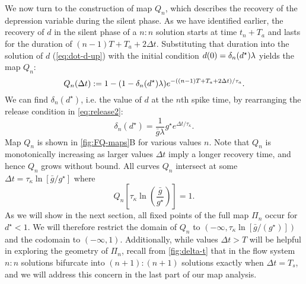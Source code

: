 We now turn to the construction of map $Q_n$, which describes the recovery of the depression variable during the silent phase.
As we have identified earlier, the recovery of $d$ in the silent phase of a $n:n$ solution starts at time $t_{n} + T_{a}$ and lasts for the duration of $(n-1)T + T_{a} + 2\Delta t$.
Substituting that duration into the solution of $d$ (\cref{eq:dot-d-up}) with the initial condition $d(0)=\delta_n(d^\star) \lambda$ yields the map $Q_{n}$:
\begin{equation}
	\label{eq:Qn-map}
	Q_n(\Delta t) := 1- (1- \delta_n(d^\star) \lambda)e^{-((n-1)T + T_{a} + 2\Delta t)/\tau_a}.
\end{equation}
\noindent
We can find $\delta_{n}(d^{\star})$, i.e. the value of $d$ at the $n$th spike time, by rearranging the release condition in \cref{eq:release2}:
\begin{equation}
	\label{eq:dn}
	\delta_{n}(d^{\star}) = \frac{1}{\bar g \lambda} g^\star e^{\Delta t/\tau_\kappa}.
\end{equation}
Map $Q_n$ is shown in \cref{fig:FQ-maps}B for various values $n$.
Note that $Q_n$ is monotonically increasing as larger values $\Delta t$ imply a longer recovery time, and hence $Q_{n}$ grows without bound.
All curves $Q_{n}$ intersect at some $\Delta t = \tau_\kappa\ln{\left[\bar g/g^\star\right]}$ where
\begin{equation}
	\label{eq:Qn-intersect}
	Q_n\left[\tau_\kappa\ln{\left(\frac{\bar g}{g^\star}\right)}\right]=1.
\end{equation}
As we will show in the next section, all fixed points of the full map $\Pi_n$ occur for $d^\star<1$.
We will therefore restrict the domain of $Q_n$ to $(-\infty, \tau_\kappa\ln{\left[\bar g/(g^\star)\right]})$ and the codomain to $(-\infty, 1)$.
Additionally, while values $\Delta t>T$ will be helpful in exploring the geometry of $\Pi_{n}$, recall from \cref{fig:delta-t} that in the flow system $n:n$ solutions bifurcate into $(n+1):(n+1)$ solutions exactly when $\Delta t = T_{s}$, and we will address this concern in the last part of our map analysis.


